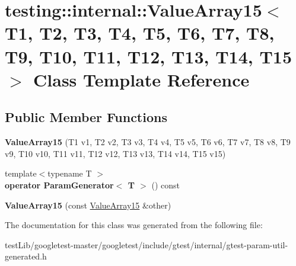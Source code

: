 \hypertarget{classtesting_1_1internal_1_1ValueArray15}{}\section{testing\+:\+:internal\+:\+:Value\+Array15$<$ T1, T2, T3, T4, T5, T6, T7, T8, T9, T10, T11, T12, T13, T14, T15 $>$ Class Template Reference}
\label{classtesting_1_1internal_1_1ValueArray15}
\subsection*{Public Member Functions}
\begin{DoxyCompactItemize}
\item 
\mbox{\label{classtesting_1_1internal_1_1ValueArray15_a2f9c6670b744cb08587bea1b50e169b4}} 
{\bfseries Value\+Array15} (T1 v1, T2 v2, T3 v3, T4 v4, T5 v5, T6 v6, T7 v7, T8 v8, T9 v9, T10 v10, T11 v11, T12 v12, T13 v13, T14 v14, T15 v15)
\item 
\mbox{\label{classtesting_1_1internal_1_1ValueArray15_ab5a77c335c83ef3f99e3133c2213c495}} 
{\footnotesize template$<$typename T $>$ }\\{\bfseries operator Param\+Generator$<$ T $>$} () const
\item 
\mbox{\label{classtesting_1_1internal_1_1ValueArray15_ab08ee6de70a42bc580229cc32635fa5c}} 
{\bfseries Value\+Array15} (const \hyperlink{classtesting_1_1internal_1_1ValueArray15}{Value\+Array15} \&other)
\end{DoxyCompactItemize}


The documentation for this class was generated from the following file\+:\begin{DoxyCompactItemize}
\item 
test\+Lib/googletest-\/master/googletest/include/gtest/internal/gtest-\/param-\/util-\/generated.\+h\end{DoxyCompactItemize}
